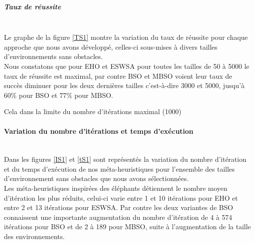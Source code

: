
\noindent
\begin{minipage}[t]{0.5\textwidth}
	\subparagraph{Taux de réussite}
	\textbf{}\\
	
	Le graphe de la figure \ref{TS1} montre la variation du taux de réussite pour chaque approche que nous avons développé, celles-ci sous-mises à divers tailles d'environnements sans obstacles.\\
	
	Nous constatons que pour EHO et ESWSA pour toutes les tailles de 50 à 5000 le taux de réussite est maximal, par contre BSO et MBSO voient leur taux de succès diminuer pour les deux dernières tailles c'est-à-dire 3000 et 5000, jusqu'à 60\% pour BSO et 77\% pour MBSO.
	
	Cela dans la limite du nombre d'itérations maximal (1000)
	
\end{minipage}\hfill
\begin{minipage}[t]{0.55\textwidth}
	\captionsetup{width=0.8\linewidth}
	\centering{}
	\label{TS1}
\end{minipage}\hfill



\newpage

\noindent
	\paragraph{Variation du nombre d'itérations et temps d'exécution}
	\textbf{ }\\
	
	Dans les figures \ref{IS1} et \ref{tS1} sont représentés la variation du nombre d'itération et du temps d'exécution de nos méta-heuristiques pour l'ensemble des tailles d'environnement sans obstacles que nous avons sélectionnées.\\
	
	Les méta-heuristiques inspirées des éléphants détiennent le nombre moyen d'itération les plus réduits, celui-ci varie entre 1 et 10 itérations pour EHO et entre 2 et 13 itérations pour ESWSA. Par contre les deux variantes de BSO connaissent une importante augmentation du nombre d'itération de 4 à 574 itérations pour BSO et de 2 à 189 pour MBSO, suite à l'augmentation de la taille des environnements.\\

